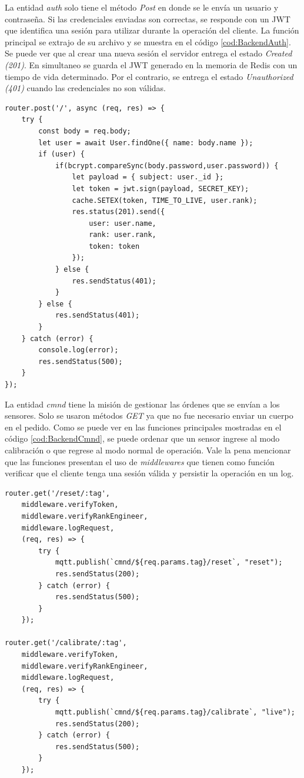 La entidad \emph{auth} solo tiene el método \emph{Post} en donde se le envía un usuario y contraseña.
Si las credenciales enviadas son correctas, se responde con un JWT que identifica una sesión para utilizar durante la operación del cliente.
La función principal se extrajo de su archivo y se muestra en el código \ref{cod:BackendAuth}.
Se puede ver que al crear una nueva sesión el servidor entrega el estado \emph{Created (201)}.
En simultaneo se guarda el JWT generado en la memoria de Redis con un tiempo de vida determinado.
Por el contrario, se entrega el estado \emph{Unauthorized (401)} cuando las credenciales no son válidas.

\newpage

\begin{lstlisting}[label=cod:BackendAuth,caption=Función principal de la entidad auth]
router.post('/', async (req, res) => {
    try {
        const body = req.body;
        let user = await User.findOne({ name: body.name });
        if (user) {
            if(bcrypt.compareSync(body.password,user.password)) {
                let payload = { subject: user._id };
                let token = jwt.sign(payload, SECRET_KEY);
                cache.SETEX(token, TIME_TO_LIVE, user.rank);
                res.status(201).send({
                    user: user.name,
                    rank: user.rank,
                    token: token
                });
            } else {
                res.sendStatus(401);
            }
        } else {
            res.sendStatus(401);
        }
    } catch (error) {
        console.log(error);
        res.sendStatus(500);
    }
});
\end{lstlisting}

La entidad \emph{cmnd} tiene la misión de gestionar las órdenes que se envían a los sensores.
Solo se usaron métodos \emph{GET} ya que no fue necesario enviar un cuerpo en el pedido.
Como se puede ver en las funciones principales mostradas en el código \ref{cod:BackendCmnd}, se puede ordenar que un sensor ingrese al modo calibración o que regrese al modo normal de operación.
Vale la pena mencionar que las funciones presentan el uso de \emph{middlewares} que tienen como función verificar que el cliente tenga una sesión válida y persistir la operación en un log.

\begin{lstlisting}[label=cod:BackendCmnd,caption=Funciones principales de la entidad cmnd]
router.get('/reset/:tag',
    middleware.verifyToken,
    middleware.verifyRankEngineer,
    middleware.logRequest,
    (req, res) => {
        try {
            mqtt.publish(`cmnd/${req.params.tag}/reset`, "reset");
            res.sendStatus(200);
        } catch (error) {
            res.sendStatus(500);
        }
    });

router.get('/calibrate/:tag',
    middleware.verifyToken,
    middleware.verifyRankEngineer,
    middleware.logRequest,
    (req, res) => {
        try {
            mqtt.publish(`cmnd/${req.params.tag}/calibrate`, "live");
            res.sendStatus(200);
        } catch (error) {
            res.sendStatus(500);
        }
    });
\end{lstlisting}

